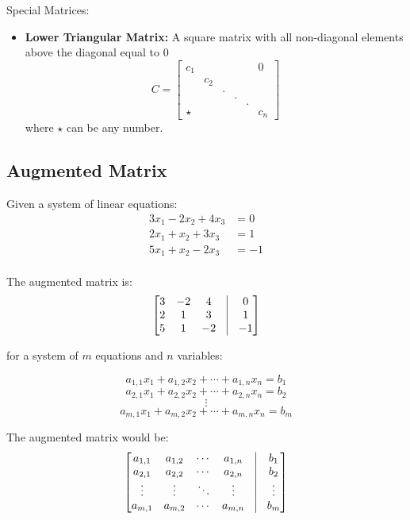 \documentclass{article}
\begin{document}
\begin{paragraph}{Special Matrices:}
\begin{itemize}
    \item \textbf{Lower Triangular Matrix:} A square matrix with all non-diagonal elements above the diagonal equal to 0
        \[ C = \begin{bmatrix}
            c_1 &&&&& 0 \\
            &c_2&&&&\\
            &&.&&&\\
            &&&.&&\\
            &&&&.&\\
            \star&&&&&c_n
        \end{bmatrix}\]
        where $\star$ can be any number.
\end{itemize}
\end{paragraph}


\subsection*{Augmented Matrix}
Given a system of linear equations:
\begin{align*}
    3x_1 - 2x_2 + 4x_3 &= 0\\
    2x_1 + x_2 + 3x_3 &= 1\\ 
    5x_1 + x_2 - 2x_3 &= -1
\end{align*}\\    
The augmented matrix is:
\[
\begin{bmatrix}
    3 & -2 & 4 & \vline & 0 \\
    2 & 1 & 3 & \vline & 1 \\
    5 & 1 & -2 & \vline & -1 
\end{bmatrix}
\]    

for a system of $m$ equations and $n$ variables:

    \[
    a_{1,1} x_1 + a_{1,2} x_2 + \cdots + a_{1,n} x_n = b_1
    \]
    \[
    a_{2,1} x_1 + a_{2,2} x_2 + \cdots + a_{2,n} x_n = b_2
    \]
    \[
    \vdots
    \]
    \[
    a_{m,1} x_1 + a_{m,2} x_2 + \cdots + a_{m,n} x_n = b_m
    \]

The augmented matrix would be:
\[
\begin{bmatrix}
    a_{1,1} & a_{1,2} & \cdots & a_{1,n} & \vline & b_1 \\
    a_{2,1} & a_{2,2} & \cdots & a_{2,n} & \vline & b_2 \\
    \vdots & \vdots & \ddots & \vdots & \vline & \vdots \\
    a_{m,1} & a_{m,2} & \cdots & a_{m,n} & \vline & b_m
\end{bmatrix}
\]
\end{document}
